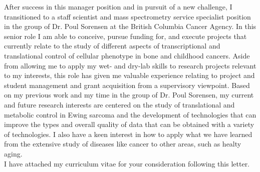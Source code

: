 \documentclass[11pt]{article}
\begin{document}
\noindent
 After success in this manager position and in pursuit of a new challenge, I transitioned to a staff scientist and mass spectrometry service specialist position in the group of Dr. Poul Sorensen at the British Columbia Cancer Agency. In this senior role I am able to conceive, pursue funding for, and execute projects that currently relate to the study of different aspects of transcriptional and translational control of cellular phenotype in bone and childhood cancers. Aside from allowing me to apply my wet- and dry-lab skills to research projects relevant to my interests, this role has given me valuable experience relating to project and student management and grant acquisition from a supervisory viewpoint. Based on my previous work and my time in the group of Dr. Poul Sorensen, my current and future research interests are centered on the study of translational and metabolic control in Ewing sarcoma and the development of technologies that can improve the types and overall quality of data that can be obtained with a variety of technologies. I also have a keen interest in how to apply what we have learned from the extensive study of diseases like cancer to other areas, such as healty aging.\\

\noindent
I have attached my curriculum vitae for your consideration following this letter.
\end{document}
